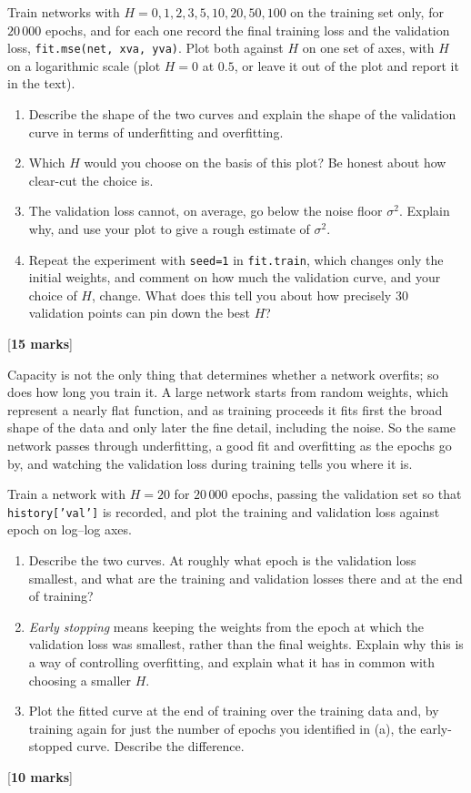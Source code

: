 \documentclass[11pt,a4paper]{article}
\newcounter{exercise}
\newenvironment{exercise}[1]{\refstepcounter{exercise}\begin{tcolorbox}[colback=blue!4,colframe=blue!50!black,title=Exercise \theexercise: #1,fonttitle=\bfseries]}{\end{tcolorbox}}
\newcommand{\mk}[1]{\hfill[\textbf{#1 marks}]}
\begin{document}
\begin{exercise}{choosing capacity with a validation set}
Train networks with $H = 0, 1, 2, 3, 5, 10, 20, 50, 100$ on the training set only, for $20\,000$ epochs, and for each one record the final training loss and the validation loss, \texttt{fit.mse(net, xva, yva)}. Plot both against $H$ on one set of axes, with $H$ on a logarithmic scale (plot $H=0$ at $0.5$, or leave it out of the plot and report it in the text).
\begin{enumerate}[label=(\alph*)]
\item Describe the shape of the two curves and explain the shape of the validation curve in terms of underfitting and overfitting.
\item Which $H$ would you choose on the basis of this plot? Be honest about how clear-cut the choice is.
\item The validation loss cannot, on average, go below the noise floor $\sigma^2$. Explain why, and use your plot to give a rough estimate of $\sigma^2$.
\item Repeat the experiment with \texttt{seed=1} in \texttt{fit.train}, which changes only the initial weights, and comment on how much the validation curve, and your choice of $H$, change. What does this tell you about how precisely 30 validation points can pin down the best $H$?
\end{enumerate}
\mk{15}
\end{exercise}

Capacity is not the only thing that determines whether a network overfits; so does how long you train it. A large network starts from random weights, which represent a nearly flat function, and as training proceeds it fits first the broad shape of the data and only later the fine detail, including the noise. So the same network passes through underfitting, a good fit and overfitting as the epochs go by, and watching the validation loss during training tells you where it is.

\begin{exercise}{early stopping}
Train a network with $H = 20$ for $20\,000$ epochs, passing the validation set so that \texttt{history['val']} is recorded, and plot the training and validation loss against epoch on log--log axes.
\begin{enumerate}[label=(\alph*)]
\item Describe the two curves. At roughly what epoch is the validation loss smallest, and what are the training and validation losses there and at the end of training?
\item \emph{Early stopping} means keeping the weights from the epoch at which the validation loss was smallest, rather than the final weights. Explain why this is a way of controlling overfitting, and explain what it has in common with choosing a smaller $H$.
\item Plot the fitted curve at the end of training over the training data and, by training again for just the number of epochs you identified in (a), the early-stopped curve. Describe the difference.
\end{enumerate}
\mk{10}
\end{exercise}
\end{document}
